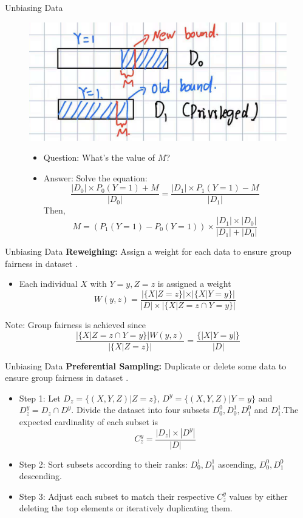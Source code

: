 \documentclass[10pt, xcolor=table,aspectratio=169]{beamer}
\begin{document}
\begin{frame}{Unbiasing Data}

	\begin{figure}[t]
		\begin{center}
			\includegraphics[width=0.3\columnwidth]{./figs/relabel.png}
		\end{center}
		\caption{}
		\begin{itemize}
			\item 	Question: What's the value of $M$?\\
			\item 	Answer: Solve the equation:
			      \[\frac{|D_0|\times P_0(Y=1)+M}{|D_0|}=\frac{|D_1|\times P_1(Y=1)-M}{|D_1|}
			      \]
			      Then,
			      \[M=\left(P_1(Y=1)-P_0(Y=1) \right)\times \frac{|D_1|\times |D_0|}{|D_1|+|D_0|}\]
		\end{itemize}
	\end{figure}

\end{frame}

\begin{frame}{Unbiasing Data}
	\textbf{Reweighing:} Assign a weight for each data to ensure group fairness in dataset \cite{kamiran2012data}.
	\begin{itemize}
		\item Each individual $X$ with $Y=y, Z=z$ is assigned a weight
		      \[W(y,z)=\frac{|\{X|Z=z\}|\times |\{X|Y=y\}|}{|D|\times |\{X|Z=z\cap Y=y\}|}\]
	\end{itemize}
	Note: Group fairness is achieved since
	\[\frac{|\{X|Z=z\cap Y=y\}|W(y,z)}{|\{X|Z=z\}|}=\frac{\{|X|Y=y|\}}{|D|}\]

\end{frame}

\begin{frame}{Unbiasing Data}
	\textbf{Preferential Sampling:} Duplicate or delete some data to ensure group fairness in dataset \cite{kamiran2012data}.
	\begin{itemize}
		\item Step 1: Let $D_z=\{(X,Y,Z)|Z=z\}$, $D^y=\{(X,Y,Z)|Y=y\}$ and $D_z^y=D_z\cap D^y$. Divide the dataset into four subsets $D_0^0, D_0^1, D_1^0$ and $D_1^1$.The expected cardinality of each subset is
		      \[C_z^y=\frac{|D_z|\times |D^y|}{|D|}\]
		\item Step 2: Sort subsets according to their ranks: $D_0^1, D_1^1$ ascending, $D_0^0, D_1^0$ descending.
		\item Step 3: Adjust each subset to match their respective $C_z^y$ values by either deleting the top elements or iteratively duplicating them.

	\end{itemize}

\end{frame}
\end{document}
